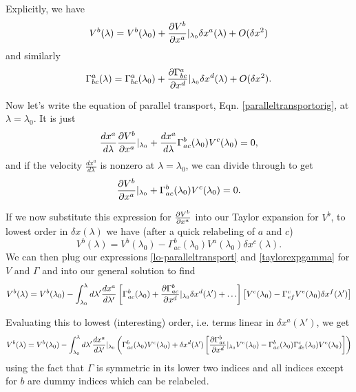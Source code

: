 Explicitly, we have
\begin{equation}\label{taylorexpv}
    V^b(\lambda)=V^b(\lambda_0) + \frac{\p V^b}{\p x^a}|_{\lambda_0} \delta x^a(\lambda)+O(\delta x^2)
\end{equation}
and similarly
\begin{equation}\label{taylorexpgamma}
  \Gamma^a_{bc}(\lambda)=\Gamma^a_{bc}(\lambda_0)+\frac{\p \Gamma^a_{bc}}{\p x^d}|_{\lambda_0}\delta x^d(\lambda)+O(\delta x^2).  
\end{equation}

Now let's write the equation of parallel transport, Eqn. \eqref{paralleltransportorig}, at $\lambda=\lambda_0.$ It is just %
$$\frac{dx^a}{d\lambda}\frac{\p V^b}{\p x^a}|_{\lambda_0}+\frac{dx^a}{d\lambda}\Gamma^b_{ac}(\lambda_0)V^c(\lambda_0)=0,$$
and if the velocity $\frac{dx^a}{d\lambda}$ is nonzero at $\lambda=\lambda_0$, we can divide through to get%
$$\frac{\p V^b}{\p x^a}|_{\lambda_0}+\Gamma^b_{ac}(\lambda_0)V^c(\lambda_0)=0.$$

If we now substitute this expression for $\P{V^b}{x^a}$ into our Taylor expansion for $V^b$, to lowest order in $\delta x(\lambda)$ we have (after a quick relabeling of $a$ and $c$)
\begin{equation}\label{lo-paralleltransport}
V^b(\lambda)=V^b(\lambda_0)-\Gamma^b_{ac}(\lambda_0)V^a(\lambda_0)\delta x^c(\lambda).
\end{equation}
We can then plug our expressions \eqref{lo-paralleltransport} and \eqref{taylorexpgamma} for $V$ and $\Gamma$ and into our general solution to find
$$V^b(\lambda)=V^b(\lambda_0) - \int_{\lambda_0}^\lambda d\lambda' \frac{dx^a}{d\lambda'}\left[\Gamma^b_{ac}(\lambda_0)+\frac{\p \Gamma^b_{ac}}{\p x^d}|_{\lambda_0} \delta x^d(\lambda')+\ldots\right]\left[V^c(\lambda_0)-\Gamma^c_{ef} V^e(\lambda_0)\delta x^f(\lambda')\right]$$

Evaluating this to lowest (interesting) order, i.e. terms linear in $\delta x^a(\lambda')$, we get
$$V^b(\lambda)=V^b(\lambda_0)
-\int_{\lambda_0}^\lambda d\lambda' \frac{dx^a}{d\lambda'}|_{\lambda_0}
\left(\Gamma^b_{ac}(\lambda_0)V^c(\lambda_0)
+\delta x^d(\lambda')\left[\frac{\p \Gamma^b_{ae}}{\p x^d}|_{\lambda_0} V^e(\lambda_0)-\Gamma^b_{ac}(\lambda_0)\Gamma^c_{de}(\lambda_0)V^e(\lambda_0)\right]\right)$$
using the fact that $\Gamma$ is symmetric in its lower two indices and all indices except for $b$ are dummy indices which can be relabeled.

